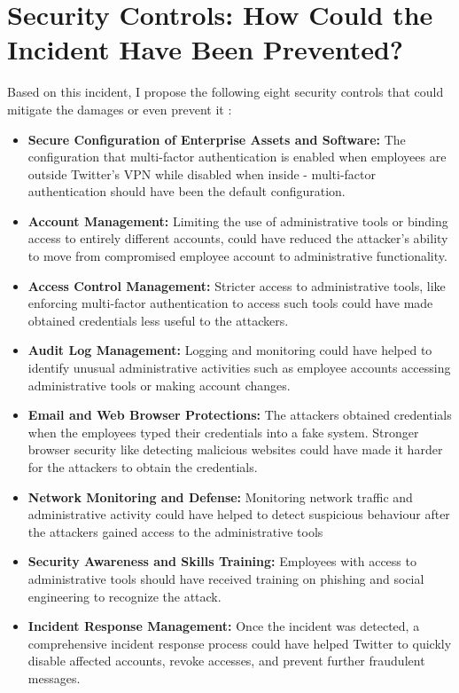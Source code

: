 \chapter{Security Controls: How Could the Incident Have Been Prevented?}
Based on this incident, I propose the following eight security controls that could mitigate the damages or even prevent it \cite{cis}:
\begin{itemize}
\item \textbf{Secure Configuration of
Enterprise Assets and Software:} The configuration that multi-factor authentication is enabled when employees are outside Twitter's VPN while disabled when inside - multi-factor authentication should have been the default configuration.
\item \textbf{Account Management:} Limiting the use of administrative tools or binding access to entirely different accounts, could have reduced the attacker's ability to move from compromised employee account to administrative functionality.
\item \textbf{Access Control Management:} Stricter access to administrative tools, like enforcing multi-factor authentication to access such tools could have made obtained credentials less useful to the attackers.
\item \textbf{Audit Log Management:} Logging and monitoring could have helped to identify unusual administrative activities such as employee accounts accessing administrative tools or making account changes.
\item \textbf{Email and Web Browser Protections:} The attackers obtained credentials when the employees typed their credentials into a fake system. Stronger browser security like detecting malicious websites could have made it harder for the attackers to obtain the credentials.
\item \textbf{Network Monitoring and Defense:} Monitoring network traffic and administrative activity could have helped to detect suspicious behaviour after the attackers gained access to the administrative tools
\item \textbf{Security Awareness and Skills Training:} Employees with access to administrative tools should have received training on phishing and social engineering to recognize the attack. 
\item \textbf{Incident Response Management:} Once the incident was detected, a comprehensive incident response process could have helped Twitter to quickly disable affected accounts, revoke accesses, and prevent further fraudulent messages.
\end{itemize}